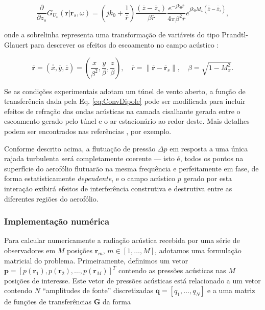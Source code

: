 \documentclass[a4paper, 11pt, twoside]{article}
\providecommand{\norm}[1]{\lVert#1\rVert}
\begin{document}
\begin{equation}
	\frac{\partial}{\partial z_s} G_{U_x} (\mathbf{r} | \mathbf{r}_s, \omega) = \left(jk_0 + \frac{1}{\overline{r}} \right) \frac{\left(\overline{z}-\overline{z}_s \right)}{\beta \overline{r}}  \frac{e^{-j k_0 \overline{r}}}{4 \pi \beta^2 \overline{r}} e^{j k_0 M_x \left( \overline{\overline{x}} - \overline{\overline{x}}_s \right)},
	\label{eq:ConvDipole}
\end{equation}

\noindent onde a sobrelinha representa uma transformação de variáveis do tipo Prandtl-Glauert para descrever os efeitos do escoamento no campo acústico \cite{Chapman00}:

\begin{equation}
	\overline{\mathbf{r}} = \left( \overline{\overline{x}}, \overline{y}, \overline{z} \right) = \left( \frac{x}{\beta^2}, \frac{y}{\beta}, \frac{z}{\beta} \right), \quad \overline{r} = \norm{\overline{\mathbf{r}} - \overline{\mathbf{r}}_s}, \quad \beta = \sqrt{1-M_x^2}.
	\label{eq:ChapmanTransformedVariables}
\end{equation}

Se as condições experimentais adotam um túnel de vento aberto, a função de transferência dada pela Eq. \ref{eq:ConvDipole} pode ser modificada para incluir efeitos de refração das ondas acústicas na camada cisalhante gerada entre o escoamento gerado pelo túnel e o ar estacionário ao redor deste. Mais detalhes podem ser encontrados nas referências \cite{Casagrande18, Casagrande_etal2020}, por exemplo.

Conforme descrito acima, a flutuação de pressão $\Delta p$ em resposta a uma única rajada turbulenta será completamente coerente --- isto é, todos os pontos na superfície do aerofólio flutuarão na mesma frequência e perfeitamente em fase, de forma estatisticamente \emph{dependente}, e o campo acústico $p$ gerado por esta interação exibirá efeitos de interferência construtiva e destrutiva entre as diferentes regiões do aerofólio.


\subsubsection{Implementação numérica}
\label{sec:NumericalImplementation_SingleGust}

Para calcular numericamente a radiação acústica recebida por uma série de observadores em $M$ posições $\mathbf{r}_m$, $m \in [1, \ldots, M]$, adotamos uma formulação matricial do problema. Primeiramente, definimos um vetor $\mathbf{p} = [p(\mathbf{r}_1), p(\mathbf{r}_2), \ldots, p(\mathbf{r}_M)]^T$ contendo as pressões acústicas nas $M$ posições de interesse. Este vetor de pressões acústicas está relacionado a um vetor contendo $N$ ``amplitudes de fonte'' discretizadas $\mathbf{q} = [q_1, \ldots, q_N]$ e a uma matriz de funções de transferências $\mathbf{G}$ da forma
\end{document}
